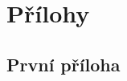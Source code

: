 \documentclass[12pt,a4paper]{report}
\begin{document}
\ifx\ThesisType\TypePhD
{}
\fi

\appendix
\chapter{Přílohy}

\section{První příloha}
\end{document}
